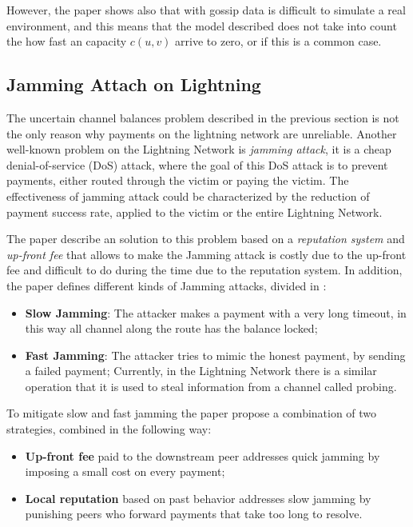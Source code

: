 However, the paper shows also that with gossip data is difficult to simulate 
a real environment, and this means that the model described does not take into 
count the how fast an capacity $c(u, v)$ arrive to zero, or if this is a 
common case.

\subsection{Jamming Attach on Lightning}
\label{sec:jamming}

The uncertain channel balances problem described in the previous section 
is not the only reason why payments on the lightning network are unreliable.
Another well-known problem on the Lightning Network is \emph{jamming attack},
it is a cheap denial-of-service (DoS) attack, where the goal of this DoS attack 
is to prevent payments, either routed through the victim or paying the victim. 
The effectiveness of jamming attack could be characterized by the reduction of 
payment success rate, applied to the victim or the entire Lightning Network.

The paper \cite{cryptoeprint:2022/1454} describe an solution to this problem 
based on a \emph{reputation system} and \emph{up-front fee} that allows to make
the Jamming attack is costly due to the up-front fee and difficult to do during the time 
due to the reputation system.
In addition, the paper defines different kinds of Jamming attacks, divided in :

\begin{itemize}
    \item {\bf Slow Jamming}: The attacker makes a payment with a very long timeout, 
        in this way all channel along the route has the balance locked;
    \item {\bf Fast Jamming}: The attacker tries to mimic the honest payment, by sending
        a failed payment; Currently, in the Lightning Network there is a similar operation
        that it is used to steal information from a channel called probing.
\end{itemize}

To mitigate slow and fast jamming the paper \cite{cryptoeprint:2022/1454}
propose a combination of two strategies, combined in the following way:

\begin{itemize}
    \item {\bf Up-front fee} paid to the downstream peer addresses quick jamming 
        by imposing a small cost on every payment;
    \item {\bf Local reputation} based on past behavior addresses slow jamming by 
        punishing peers who forward payments that take too long to resolve.
\end{itemize}

